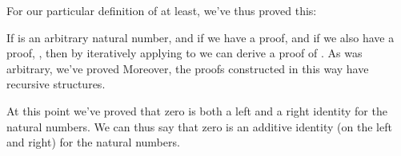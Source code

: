 \documentclass[letterpaper,10pt,english]{sphinxmanual}
\begin{document}
\sphinxAtStartPar
For our particular definition of  at least, we’ve thus proved this:

\begin{sphinxVerbatim}[commandchars=\\\{\}]
   
    
             
   
\end{sphinxVerbatim}

\sphinxAtStartPar
If  is an arbitrary natural number, and if we have a
proof,  and if we also have a proof, , then by iteratively applying
 to  we can derive a proof of . As 
was arbitrary, we’ve proved  Moreover, the proofs
constructed in this way have recursive structures.

\sphinxAtStartPar
At this point we’ve proved that zero is both a left and a
right identity for the natural numbers. We can thus say that
zero is an additive identity (on the left and right) for the
natural numbers.

\begin{sphinxVerbatim}[commandchars=\\\{\}]
 


   

       
        

       
  
 
 

     
   
        

  

  
\end{sphinxVerbatim}
\end{document}
